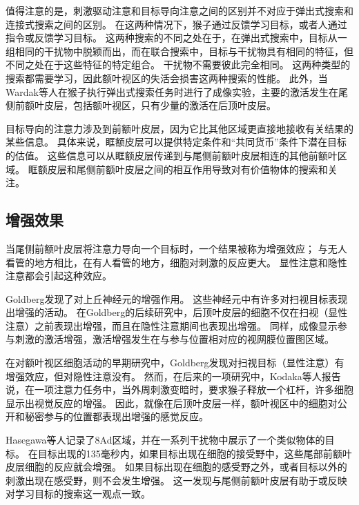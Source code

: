 值得注意的是，刺激驱动注意和目标导向注意之间的区别并不对应于弹出式搜索和连接式搜索之间的区别。
在这两种情况下，猴子通过反馈学习目标，或者人通过指令或反馈学习目标。
这两种搜索的不同之处在于，在弹出式搜索中，目标从一组相同的干扰物中脱颖而出，而在联合搜索中，目标与干扰物具有相同的特征，但不同之处在于这些特征的特定组合。
干扰物不需要彼此完全相同。
这两种类型的搜索都需要学习，因此额叶视区的失活会损害这两种搜索的性能\cite{wardak2004deficit}。
此外，当Wardak等人\cite{wardak2010searching}在猴子执行弹出式搜索任务时进行了成像实验，主要的激活发生在尾侧前额叶皮层，包括额叶视区，只有少量的激活在后顶叶皮层。


目标导向的注意力涉及到前额叶皮层，因为它比其他区域更直接地接收有关结果的某些信息。
具体来说，眶额皮层可以提供特定条件和“共同货币”条件下潜在目标的估值。
这些信息可以从眶额皮层传递到与尾侧前额叶皮层相连的其他前额叶区域。
眶额皮层和尾侧前额叶皮层之间的相互作用导致对有价值物体的搜索和关注。



\subsection{增强效果}

当尾侧前额叶皮层将注意力导向一个目标时，一个结果被称为增强效应；
与无人看管的地方相比，在有人看管的地方，细胞对刺激的反应更大。
显性注意和隐性注意都会引起这种效应。


Goldberg\cite{goldberg1972activity}发现了对上丘神经元的增强作用。
这些神经元中有许多对扫视目标表现出增强的活动。
在Goldberg\cite{goldberg1981behavioral}的后续研究中，后顶叶皮层的细胞不仅在扫视（显性注意）之前表现出增强，而且在隐性注意期间也表现出增强。
同样，成像显示参与刺激的激活增强\cite{corbetta2000voluntary}，激活增强发生在与参与位置相对应的视网膜位置图区域\cite{brefczynski1999physiological}。


在对额叶视区细胞活动的早期研究中，Goldberg\cite{goldberg1985cerebral}发现对扫视目标（显性注意）有增强效应，但对隐性注意没有。
然而，在后来的一项研究中，Kodaka等人\cite{kodaka1997neuronal}报告说，在一项注意力任务中，当外周刺激变暗时，要求猴子释放一个杠杆，许多细胞显示出视觉反应的增强。
因此，就像在后顶叶皮层一样，额叶视区中的细胞对公开和秘密参与的位置都表现出增强的感觉反应。


Hasegawa等人\cite{hasegawa2000search}记录了8Ad区域，并在一系列干扰物中展示了一个类似物体的目标。
在目标出现的135毫秒内，如果目标出现在细胞的接受野中，这些尾部前额叶皮层细胞的反应就会增强。
如果目标出现在细胞的感受野之外，或者目标以外的刺激出现在感受野，则不会发生增强。
这一发现与尾侧前额叶皮层有助于或反映对学习目标的搜索这一观点一致。



